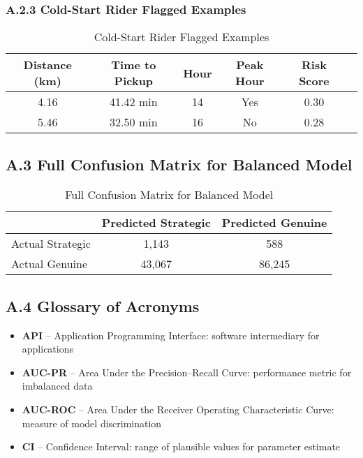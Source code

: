 \subsubsection*{A.2.3 Cold-Start Rider Flagged Examples}

\begin{table}[H]
\centering
\caption{Cold-Start Rider Flagged Examples}
\label{tab:cold_start_examples}
\begin{tabular}{cccccc}
\toprule
\textbf{Distance (km)} & \textbf{Time to Pickup} & \textbf{Hour} & \textbf{Peak Hour} & \textbf{Risk Score} \\
\midrule
4.16 & 41.42 min & 14 & Yes & 0.30 \\
5.46 & 32.50 min & 16 & No  & 0.28 \\
\bottomrule
\end{tabular}
\end{table}

\vspace{1em}

\subsection*{A.3 Full Confusion Matrix for Balanced Model}

\begin{table}[H]
\centering
\caption{Full Confusion Matrix for Balanced Model}
\label{tab:balanced_confusion}
\begin{tabular}{lcc}
\toprule
\textbf{} & \textbf{Predicted Strategic} & \textbf{Predicted Genuine} \\
\midrule
Actual Strategic & 1,143 & 588 \\
Actual Genuine   & 43,067 & 86,245 \\
\bottomrule
\end{tabular}
\end{table}

\vspace{1em}

\subsection*{A.4 Glossary of Acronyms}

\begin{itemize}
    \item \textbf{API} -- Application Programming Interface: software intermediary for applications
    \item \textbf{AUC-PR} -- Area Under the Precision--Recall Curve: performance metric for imbalanced data
    \item \textbf{AUC-ROC} -- Area Under the Receiver Operating Characteristic Curve: measure of model discrimination
    \item \textbf{CI} -- Confidence Interval: range of plausible values for parameter estimate
\end{itemize}


